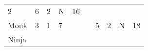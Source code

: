 \documentclass[12pt]{article}
\newcommand{\indexClass}[1]{\index{#1}}
\newcommand{\class}[1]{#1\indexClass{#1}}
\begin{document}
\begin{longtable}[]{@{}llllllllll@{}}
\begin{minipage}[t]{0.06\columnwidth}\raggedright\strut
2
\strut\end{minipage} &
\begin{minipage}[t]{0.06\columnwidth}\raggedright\strut
6
\strut\end{minipage} &
\begin{minipage}[t]{0.06\columnwidth}\raggedright\strut
2
\strut\end{minipage} &
\begin{minipage}[t]{0.07\columnwidth}\raggedright\strut
N
\strut\end{minipage} &
\begin{minipage}[t]{0.08\columnwidth}\raggedright\strut
16
\strut\end{minipage}\tabularnewline
\begin{minipage}[t]{0.13\columnwidth}\raggedright\strut
\class{Monk}
\strut\end{minipage} &
\begin{minipage}[t]{0.06\columnwidth}\raggedright\strut
3
\strut\end{minipage} &
\begin{minipage}[t]{0.06\columnwidth}\raggedright\strut
1
\strut\end{minipage} &
\begin{minipage}[t]{0.06\columnwidth}\raggedright\strut
7
\strut\end{minipage} &
\begin{minipage}[t]{0.06\columnwidth}\raggedright\strut
\strut\end{minipage} &
\begin{minipage}[t]{0.06\columnwidth}\raggedright\strut
\strut\end{minipage} &
\begin{minipage}[t]{0.06\columnwidth}\raggedright\strut
5
\strut\end{minipage} &
\begin{minipage}[t]{0.06\columnwidth}\raggedright\strut
2
\strut\end{minipage} &
\begin{minipage}[t]{0.07\columnwidth}\raggedright\strut
N
\strut\end{minipage} &
\begin{minipage}[t]{0.08\columnwidth}\raggedright\strut
18
\strut\end{minipage}\tabularnewline
\begin{minipage}[t]{0.13\columnwidth}\raggedright\strut
\class{Ninja}
\strut\end{minipage} &

\end{longtable}
\end{document}
